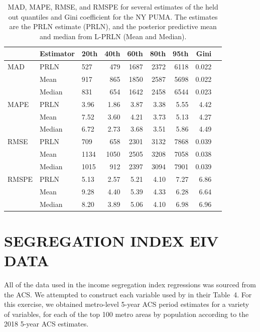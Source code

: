 \documentclass[12pt]{article}
\begin{document}
\begin{table}[ht]
  \centering
  \begin{tabular}{lllrrrrrr}
    \hline
            & Estimator & 20th & 40th & 60th & 80th & 95th & Gini \\
    \hline
    MAD     & PRLN          & 527   & 479  & 1687 & 2372 & 6118 & 0.022 \\
            & Mean          & 917   & 865  & 1850 & 2587 & 5698 & 0.022 \\
            & Median        & 831   & 654  & 1642 & 2458 & 6544 & 0.023 \\
    MAPE    & PRLN          & 3.96  & 1.86 & 3.87 & 3.38 & 5.55 & 4.42 \\
            & Mean          & 7.52  & 3.60 & 4.21 & 3.73 & 5.13 & 4.27 \\
            & Median        & 6.72  & 2.73 & 3.68 & 3.51 & 5.86 & 4.49 \\
    RMSE    & PRLN          & 709   & 658  & 2301 & 3132 & 7868 & 0.039 \\
            & Mean          & 1134  & 1050 & 2505 & 3208 & 7058 & 0.038 \\
            & Median        & 1015  & 912  & 2397 & 3094 & 7901 & 0.039 \\
    RMSPE   & PRLN          & 5.13  & 2.57 & 5.21 & 4.10 & 7.27 & 6.86 \\
            & Mean          & 9.28  & 4.40 & 5.39 & 4.33 & 6.28 & 6.64 \\
            & Median        & 8.20  & 3.89 & 5.06 & 4.10 & 6.98 & 6.96 \\
    \hline
  \end{tabular}
  \caption{MAD, MAPE, RMSE, and RMSPE for several estimates of the held out quantiles and Gini coefficient for the NY PUMA. The estimates are the PRLN estimate (PRLN), and the posterior predictive mean and median from L-PRLN (Mean and Median).}
  \label{tab:ny.metric}
\end{table}

\clearpage

\section{SEGREGATION INDEX EIV DATA}\label{app:data}
\setcounter{table}{0}
All of the data used in the income segregation index regressions was sourced from the ACS. We attempted to construct each variable used by \citet{reardon2011income} in their Table~4. For this exercise, we obtained metro-level 5-year ACS period estimates for a variety of variables, for each of the top 100 metro areas by population according to the 2018 5-year ACS estimates.
\end{document}
